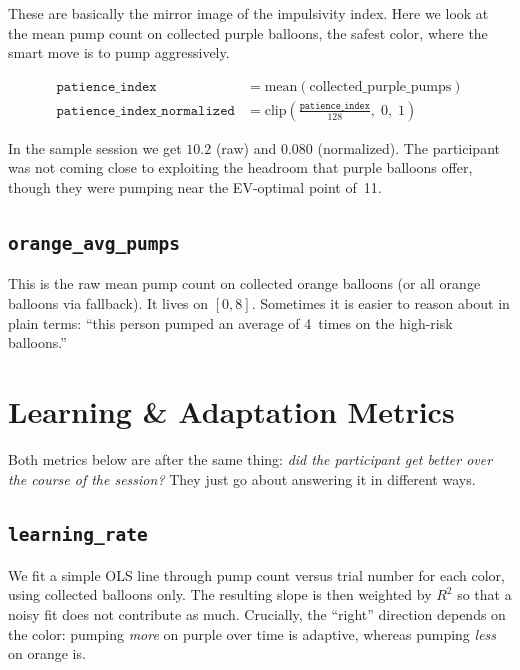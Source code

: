 \documentclass[11pt,a4paper]{article}
\begin{document}
These are basically the mirror image of the impulsivity index. Here we look at
the mean pump count on collected purple balloons, the safest color, where the
smart move is to pump aggressively.

\begin{align}
    \texttt{patience\_index} &= \text{mean}(\text{collected\_purple\_pumps}) \\[2pt]
    \texttt{patience\_index\_normalized} &= \text{clip}\!\left(
        \frac{\texttt{patience\_index}}{128},\; 0,\; 1\right)
\end{align}

In the sample session we get $10.2$ (raw) and $0.080$ (normalized). The
participant was not coming close to exploiting the headroom that purple balloons
offer, though they were pumping near the EV-optimal point of~11.


\subsection{\texttt{orange\_avg\_pumps}}

This is the raw mean pump count on collected orange balloons (or all orange
balloons via fallback). It lives on $[0, 8]$. Sometimes it is easier to reason
about in plain terms: ``this person pumped an average of 4~times on the
high-risk balloons.''


\section{Learning \& Adaptation Metrics}

Both metrics below are after the same thing: \emph{did the participant get
better over the course of the session?}  They just go about answering it
in different ways.

\subsection{\texttt{learning\_rate}}

We fit a simple OLS line through pump count versus trial number for each color,
using collected balloons only. The resulting slope is then weighted by $R^2$
so that a noisy fit does not contribute as much. Crucially, the ``right''
direction depends on the color: pumping \emph{more} on purple over time is
adaptive, whereas pumping \emph{less} on orange is.
\end{document}
